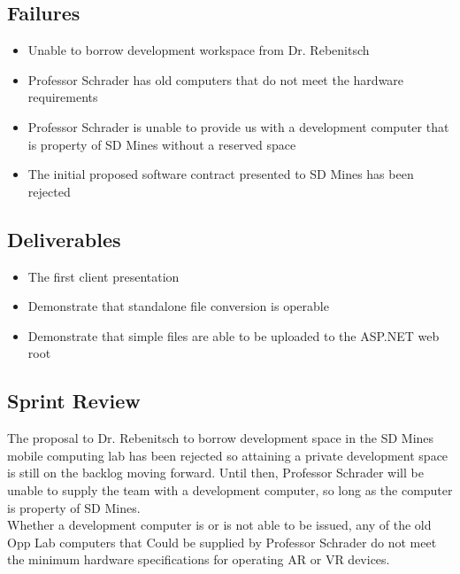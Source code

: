     \subsection{Failures}
    \label{sec:Sprint2_failures}
        \begin{itemize}
            \item Unable to borrow development workspace from Dr. Rebenitsch
            \item Professor Schrader has old computers that do not meet the hardware requirements
            \item Professor Schrader is unable to provide us with a development computer that is property of SD Mines without a reserved space  
            \item The initial proposed software contract presented to SD Mines has been rejected
        \end{itemize}

    \subsection{Deliverables}
    \label{sec:Sprint2_deliverables}
    \begin{itemize}
        \item The first client presentation
        \item Demonstrate that standalone file conversion is operable
        \item Demonstrate that simple files are able to be uploaded to the ASP.NET web root
    \end{itemize}

    \subsection{Sprint Review}
    \label{sec:Sprint2_review}
        \hspace{7mm}
        The proposal to Dr. Rebenitsch to borrow development space in the SD Mines mobile computing lab has
        been rejected so attaining a private development space is still on the backlog moving forward.  Until
        then, Professor Schrader will be unable to supply the team with a development computer, so long as the
        computer is property of SD Mines.\\

        Whether a development computer is or is not able to be issued, any of the old Opp Lab computers that Could
        be supplied by Professor Schrader do not meet the minimum hardware specifications for operating AR or VR
        devices.\\

